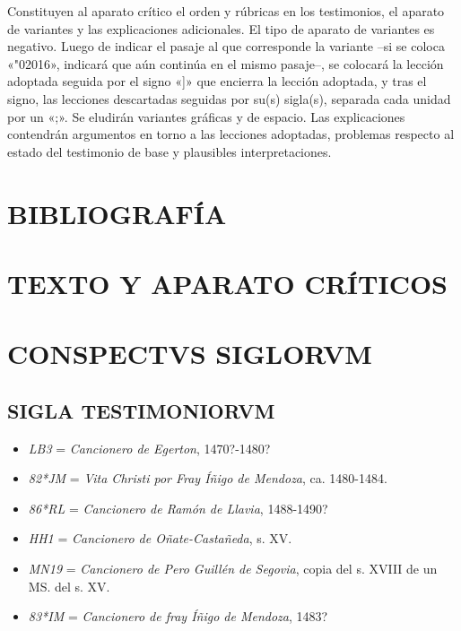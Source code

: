 \documentclass[11pt,a4paper,twoside]{article}
\newcommand{\comillas}[1]{«#1»}
\newcommand{\eg}{{\emph{LB3}}}
\newcommand{\jm}{\emph{82*JM}}
\newcommand{\rl}{\emph{86*RL}}
\newcommand{\hh}{\emph{HH1}}
\newcommand{\mn}{\emph{MN19}}
\newcommand{\im}{\emph{83*IM}}
\begin{document}
%
Constituyen al aparato crítico el orden y rúbricas en los testimonios, el aparato de variantes y las explicaciones adicionales. El tipo de aparato de variantes es negativo. Luego de indicar el pasaje al que corresponde la variante --si se coloca \comillas{\char"02016}, indicará que aún continúa en el mismo pasaje--, se colocará la lección adoptada seguida por el signo \comillas{]} que encierra la lección adoptada, y tras el signo, las lecciones descartadas seguidas por su(s) sigla(s), separada cada unidad por un \comillas{;}. Se eludirán variantes gráficas y de espacio. Las explicaciones contendrán argumentos en torno a las lecciones adoptadas, problemas respecto al estado del testimonio de base y plausibles interpretaciones.\par

\section*{\centering\normalsize BIBLIOGRAFÍA}
\nocite{*}
\printbibliography[heading=none]
\newpage

\section*{\centering\normalsize TEXTO Y APARATO CRÍTICOS}
\newpage

\section*{\centering\normalsize CONSPECTVS SIGLORVM}

\subsection*{\centering\small SIGLA TESTIMONIORVM}
\vspace*{-2.5pt}
\begin{itemize}[label=,leftmargin=0.6cm]%
\item {\eg} = \emph{Cancionero de Egerton}, 1470?-1480?
\item {\jm} = \emph{Vita Christi por Fray Íñigo de Mendoza}, ca. 1480-1484.
\item {\rl} = \emph{Cancionero de Ramón de Llavia}, 1488-1490?
\item {\hh} = \emph{Cancionero de Oñate-Castañeda}, s. XV.
\item {\mn} = \emph{Cancionero de Pero Guillén de Segovia}, copia del s. XVIII de un MS. del s. XV.
\item {\im} = \emph{Cancionero de fray Íñigo de Mendoza}, 1483?%
\end{itemize}
\end{document}
